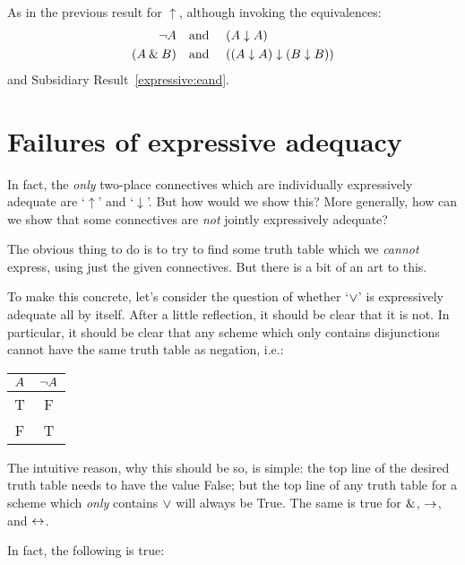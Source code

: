 As in the previous result for $\uparrow$, although invoking the equivalences:
		\begin{align*}
			\neg A &\text{\quad and \quad} (A \downarrow A)\\
			(A \mathbin{\&} B) & \text{\quad and \quad} ((A \downarrow A) \downarrow (B \downarrow B))
		\end{align*}
and Subsidiary Result~\ref{expressive:eand}.


\section{Failures of expressive adequacy}

In fact, the \emph{only} two-place connectives which are individually expressively adequate are `$\uparrow$' and `$\downarrow$'. But how would we show this? More generally, how can we show that some connectives are \emph{not} jointly expressively adequate?

The obvious thing to do is to try to find some truth table which we \emph{cannot} express, using just the given connectives. But there is a bit of an art to this.

To make this concrete, let's consider the question of whether `$\vee$' is expressively adequate all by itself. After a little reflection, it should be clear that it is not. In particular, it should be clear that any scheme which only contains disjunctions cannot have the same truth table as negation, i.e.:
				\begin{center}
				\begin{tabular}{c | c}
				$A$ & $\neg A$\\
				\hline
				 T & F \\
				 F & T
				\end{tabular}
				\end{center}
The intuitive reason, why this should be so, is simple: the top line of the desired truth table needs to have the value False; but the top line of any truth table for a scheme which \emph{only} contains $\vee$ will always be True. The same is true for $\mathbin{\&}$, $\rightarrow$, and $\leftrightarrow$.

In fact, the following is true:



